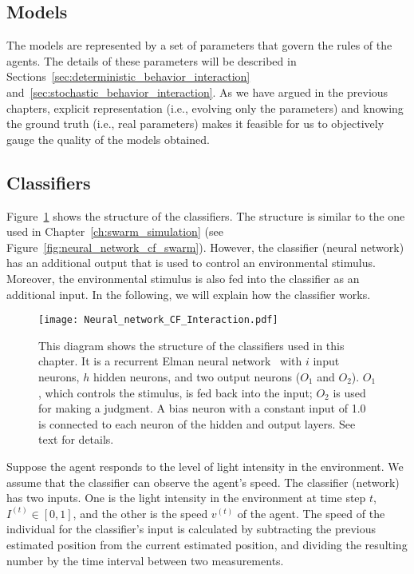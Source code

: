 \subsection{Models}\label{sec:model_deterministic_interaction} 

The models are represented by a set of parameters that govern the rules of the agents. The details of these parameters will be described in Sections~\ref{sec:deterministic_behavior_interaction} and~\ref{sec:stochastic_behavior_interaction}. As we have argued in the previous chapters, explicit representation (i.e., evolving only the parameters) and knowing the ground truth (i.e., real parameters) makes it feasible for us to objectively gauge the quality of the models obtained. 

\subsection{Classifiers}

Figure~\ref{fig:neural_network_interaction} shows the structure of the classifiers. The structure is similar to the one used in Chapter~\ref{ch:swarm_simulation} (see Figure~\ref{fig:neural_network_cf_swarm}). However, the classifier (neural network) has an additional output that is used to control an environmental stimulus. Moreover, the environmental stimulus is also fed into the classifier as an additional input. In the following, we will explain how the classifier works.

\begin{figure}[!t]
    \centering
    \texttt{[image: Neural\_network\_CF\_Interaction.pdf]}
    \caption{This diagram shows the structure of the classifiers used in this chapter. It is a recurrent Elman neural network~\cite{Elman1990} with $i$ input neurons, $h$ hidden neurons, and two output neurons ($O_1$ and $O_2$). $O_1$, which controls the stimulus, is fed back into the input; $O_2$ is used for making a judgment. A bias neuron with a constant input of 1.0 is connected to each neuron of the hidden and output layers. See text for details.}
    \label{fig:neural_network_interaction}
\end{figure}

Suppose the agent responds to the level of light intensity in the environment. We assume that the classifier can observe the agent's speed. The classifier (network) has two inputs. One is the light intensity in the environment at time step $t$, $I^{\left(t\right)}\in [0,1]$, and the other is the speed $v^{\left(t\right)}$ of the agent. The speed of the individual for the classifier's input is calculated by subtracting the previous estimated position from the current estimated position, and dividing the resulting number by the time interval between two measurements.

